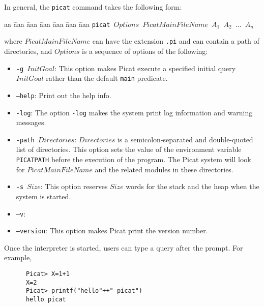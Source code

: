 In general, the \texttt{picat} command takes the following form:
\begin{tabbing}
aa \= aaa \= aaa \= aaa \= aaa \= aaa \= aaa \kill
\> \texttt{picat $Options$ $PicatMainFileName$ $A_1$ $A_2$ $\ldots$ $A_n$}
\end{tabbing}
where $PicatMainFileName$ can have the extension \texttt{.pi} and can contain a path of directories, and $Options$ is a sequence of options of the following:
\begin{itemize}
\item \texttt{-g $InitGoal$}: This option makes Picat execute a specified initial query $InitGoal$ rather than the default \texttt{main} predicate.

\item \texttt{--help}: Print out the help info.

\item \texttt{-log}: The option \texttt{-log} makes the system print log information and warning messages. 

\item \texttt{-path $Directories$}: $Directories$ is a semicolon-separated and double-quoted list of directories. This option sets the value of the environment variable \texttt{PICATPATH} before the execution of the program. The Picat system will look for $PicatMainFileName$ and the related modules in these directories. 

\item \texttt{-s $Size$}: This option reserves $Size$ words for the stack and the heap when the system is started.

\item \texttt{--v}:
\item \texttt{--version}: This option makes Picat print the version number.
\end{itemize}

Once the interpreter is started, users can type a query after the prompt. For example,
\begin{verbatim}
      Picat> X=1+1
      X=2
      Picat> printf("hello"++" picat")
      hello picat
\end{verbatim}

